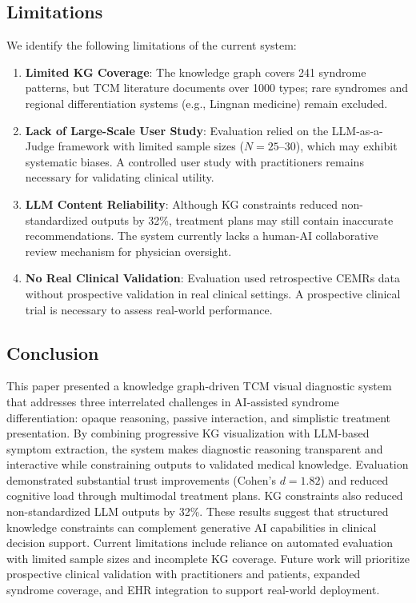 \subsection{Limitations}\label{sec:limitations}

We identify the following limitations of the current system:

\begin{enumerate}
  \item \textbf{Limited KG Coverage}: The knowledge graph covers 241 syndrome patterns, but TCM literature documents over 1000 types; rare syndromes and regional differentiation systems (e.g., Lingnan medicine) remain excluded.
  \item \textbf{Lack of Large-Scale User Study}: Evaluation relied on the LLM-as-a-Judge framework with limited sample sizes ($N=25$--$30$), which may exhibit systematic biases. A controlled user study with practitioners remains necessary for validating clinical utility.
  \item \textbf{LLM Content Reliability}: Although KG constraints reduced non-standardized outputs by 32\%, treatment plans may still contain inaccurate recommendations. The system currently lacks a human-AI collaborative review mechanism for physician oversight.
  \item \textbf{No Real Clinical Validation}: Evaluation used retrospective CEMRs data without prospective validation in real clinical settings. A prospective clinical trial is necessary to assess real-world performance.
\end{enumerate}

\subsection{Conclusion}\label{sec:conclusion}

This paper presented a knowledge graph-driven TCM visual diagnostic system that addresses three interrelated challenges in AI-assisted syndrome differentiation: opaque reasoning, passive interaction, and simplistic treatment presentation. By combining progressive KG visualization with LLM-based symptom extraction, the system makes diagnostic reasoning transparent and interactive while constraining outputs to validated medical knowledge. Evaluation demonstrated substantial trust improvements (Cohen's $d=1.82$) and reduced cognitive load through multimodal treatment plans. KG constraints also reduced non-standardized LLM outputs by 32\%. These results suggest that structured knowledge constraints can complement generative AI capabilities in clinical decision support. Current limitations include reliance on automated evaluation with limited sample sizes and incomplete KG coverage. Future work will prioritize prospective clinical validation with practitioners and patients, expanded syndrome coverage, and EHR integration to support real-world deployment.
